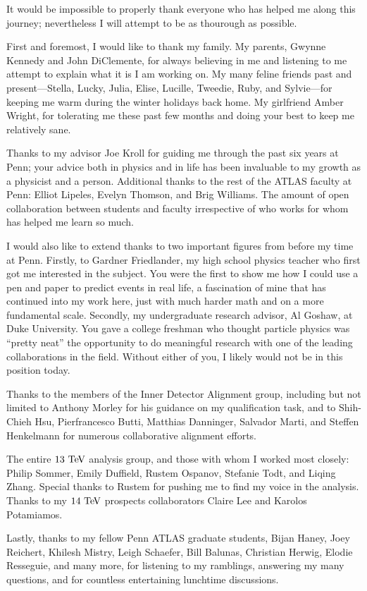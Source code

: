 It would be impossible to properly thank everyone who has helped me along this journey; nevertheless I will attempt to be as thourough as possible.

First and foremost, I would like to thank my family.
My parents, Gwynne Kennedy and John DiClemente, for always believing in me and listening to me attempt to explain what it is I am working on.
My many feline friends past and present---Stella, Lucky, Julia, Elise, Lucille, Tweedie, Ruby, and Sylvie---for keeping me warm during the winter holidays back home.
My girlfriend Amber Wright, for tolerating me these past few months and doing your best to keep me relatively sane.

Thanks to my advisor Joe Kroll for guiding me through the past six years at Penn; your advice both in physics and in life has been invaluable to my growth as a physicist and a person.
Additional thanks to the rest of the ATLAS faculty at Penn: Elliot Lipeles, Evelyn Thomson, and Brig Williams.
The amount of open collaboration between students and faculty irrespective of who works for whom has helped me learn so much.

I would also like to extend thanks to two important figures from before my time at Penn.
Firstly, to Gardner Friedlander, my high school physics teacher who first got me interested in the subject.
You were the first to show me how I could use a pen and paper to predict events in real life, a fascination of mine that has continued into my work here, just with much harder math and on a more fundamental scale.
Secondly, my undergraduate research advisor, Al Goshaw, at Duke University.
You gave a college freshman who thought particle physics was ``pretty neat'' the opportunity to do meaningful research with one of the leading collaborations in the field.
Without either of you, I likely would not be in this position today.

Thanks to the members of the Inner Detector Alignment group, including but not limited to Anthony Morley for his guidance on my qualification task, and to Shih-Chieh Hsu, Pierfrancesco Butti, Matthias Danninger, Salvador Marti, and Steffen Henkelmann for numerous collaborative alignment efforts.

The entire \ssww $13\tev$ analysis group, and those with whom I worked most closely: Philip Sommer, Emily Duffield, Rustem Ospanov, Stefanie Todt, and Liqing Zhang.
Special thanks to Rustem for pushing me to find my voice in the analysis.
Thanks to my \ssww $14\tev$ prospects collaborators Claire Lee and Karolos Potamiamos.

Lastly, thanks to my fellow Penn ATLAS graduate students, Bijan Haney, Joey Reichert, Khilesh Mistry, Leigh Schaefer, Bill Balunas, Christian Herwig, Elodie Resseguie, and many more, for listening to my ramblings, answering my many questions, and for countless entertaining lunchtime discussions.
